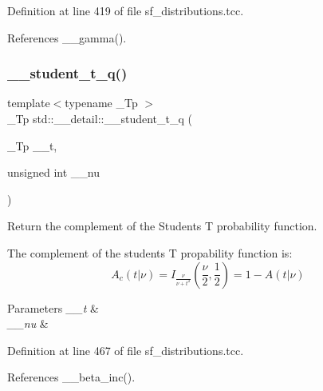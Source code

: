 Definition at line 419 of file sf\+\_\+distributions.\+tcc.



References \+\_\+\+\_\+gamma().

\mbox{\label{namespacestd_1_1____detail_aa430c479c2f41513393d7cb946d260c3}} 
\subsubsection{\texorpdfstring{\+\_\+\+\_\+student\+\_\+t\+\_\+q()}{\_\_student\_t\_q()}}
{\footnotesize\ttfamily template$<$typename \+\_\+\+Tp $>$ \\
\+\_\+\+Tp std\+::\+\_\+\+\_\+detail\+::\+\_\+\+\_\+student\+\_\+t\+\_\+q (\begin{DoxyParamCaption}\item[{\+\_\+\+Tp}]{\+\_\+\+\_\+t,  }\item[{unsigned int}]{\+\_\+\+\_\+nu }\end{DoxyParamCaption})}



Return the complement of the Students T probability function. 

The complement of the students T propability function is\+: \[ A_c(t|\nu) = I_{\frac{\nu}{\nu + t^2}}(\frac{\nu}{2}, \frac{1}{2}) = 1 - A(t|\nu) \]


\begin{DoxyParams}{Parameters}
{\em \+\_\+\+\_\+t} & \\
\hline
{\em \+\_\+\+\_\+nu} & \\
\hline
\end{DoxyParams}


Definition at line 467 of file sf\+\_\+distributions.\+tcc.



References \+\_\+\+\_\+beta\+\_\+inc().

\mbox{\label{namespacestd_1_1____detail_a72fd3b7fcf9f49ade9411d782e8dbe4e}} 
